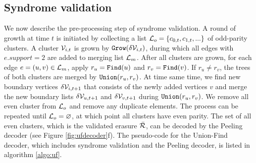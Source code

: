 \begin{algorithm}[h]
  \BlankLine
  \BlankLine

  \BlankLine
  \caption{}\label{algo:ufgrow}
\end{algorithm}

\subsection{Syndrome validation}
We now describe the pre-processing step of syndrome validation. A round of growth at time $t$ is initiated by collecting a list $\mathcal{L}_o = \{c_{0,t}, c_{1,t}, ...\}$ of odd-parity clusters. A cluster $\mathcal{V}_{i,t}$ is grown by $\texttt{Grow}(\delta \mathcal{V}_{i,t})$, during which all edges with $e.support=2$ are added to merging list $\mathcal{L}_m$. After all clusters are grown, for each edge $e=(u,v) \in \mathcal{L}_m$, apply $r_u=\texttt{Find}(u)$ and $r_v=\texttt{Find}(v)$. If $r_u\neq r_v$, the trees of both clusters are merged by $\texttt{Union}(r_u,r_v)$. At time same time, we find new boundary vertices $\delta \mathcal{V}_{i,t+1}$ that consists of the newly added vertices $v$ and merge the new boundary lists $\delta \mathcal{V}_{u,t+1}$ and $\delta \mathcal{V}_{v,t+1}$ during $\texttt{Union}(r_u,r_v)$. We remove all even cluster from $\mathcal{L}_o$ and remove any duplicate elements. The process can be repeated until $\mathcal{L}_o=\varnothing$, at which point all clusters have even parity. The set of all even clusters, which is the validated erasure $\bar{\mathcal{R}}$, can be decoded by the Peeling decoder (see Figure \ref{fig:ufdecoder}f). The pseudo-code for the Union-Find decoder, which includes syndrome validation and the Peeling decoder, is listed in algorithm \ref{algo:uf}. 



